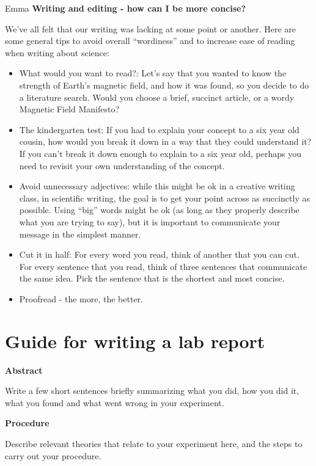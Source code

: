 \begin{studentOpinion}{Emma}
\textbf{Writing and editing - how can I be more concise?}

We've all felt that our writing was lacking at some point or another. Here are some general tips to avoid overall ``wordiness'' and to increase ease of reading when writing about science: 

\begin{itemize}
\item What would you want to read?: Let's say that you wanted to know the strength of Earth's magnetic field, and how it was found, so you decide to do a literature search. Would you choose a brief, succinct article, or a wordy Magnetic Field Manifesto?
\item The kindergarten test: If you had to explain your concept to a six year old cousin, how would you break it down in a way that they could understand it? If you can't break it down enough to explain to a six year old, perhaps you need to revisit your own understanding of the concept.
\item Avoid unnecessary adjectives: while this might be ok in a creative writing class, in scientific writing, the goal is to get your point across as succinctly as possible. Using ``big'' words might be ok (as long as they properly describe what you are trying to say), but it is important to communicate your message in the simplest manner. 
\item Cut it in half: For every word you read, think of another that you can cut. For every sentence that you read, think of three sentences that communicate the same idea. Pick the sentence that is the shortest and most concise. 
\item Proofread - the more, the better.
\end{itemize}
\end{studentOpinion}

\newpage
\section{Guide for writing a lab report}
 \vspace{0.25cm}
\textbf{Abstract}

Write a few short sentences briefly summarizing what you did, how you did it, what you found and what went wrong in your experiment.

\textbf{Procedure}

Describe relevant theories that relate to your experiment here, and the steps to carry out your procedure. 

